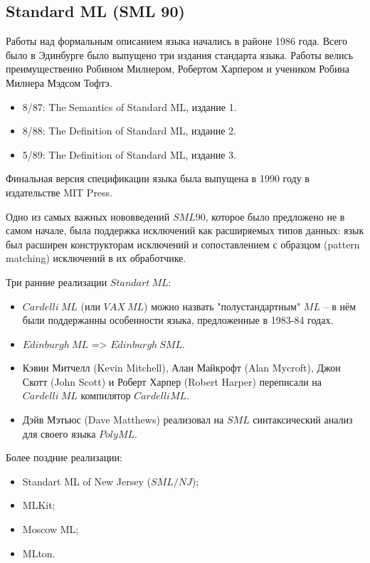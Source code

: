 \documentclass[14pt]{matmex-diploma-custom}
\begin{document}
\subsection{Standard ML (SML 90)}
Работы над формальным описанием языка начались в районе 1986 года. Всего было в Эдинбурге было выпущено три издания стандарта языка. Работы велись преимущественно Робином  Милнером, Робертом Харпером и учеником Робина Милнера Мэдсом Тофтэ.
\begin{itemize}
\item 8/87: The Semantics of Standard ML, издание 1.
\item 8/88: The Definition of Standard ML, издание 2.
\item 5/89: The Definition of Standard ML, издание 3.
\end{itemize}
Финальная версия спецификации языка была выпущена в 1990 году в издательстве MIT Press.

Одно из самых важных нововведений $SML 90$, которое было предложено не в самом начале, была поддержка исключений как расширяемых типов данных: язык был расширен конструкторам исключений и сопоставлением с образцом (pattern matching) исключений в их обработчике. 

Три ранние реализации $Standart\ M\!L$:
\begin{itemize}
\item $Cardelli\ M\!L$ (или $V\!AX\ M\!L$) можно назвать "полустандартным" $M\!L$ -- в нём были поддержанны особенности языка, предложенные в 1983-84 годах.
\item $Edinburgh\ ML$ => $Edinburgh\ SM\!L$.
\item Кэвин Митчелл (Kevin Mitchell), Алан Майкрофт (Alan Mycroft), Джон Скотт (John Scott) и Роберт Харпер (Robert Harper) переписали на $Cardelli\ ML$ компилятор $Cardelli ML$.
\item Дэйв Мэтьюс (Dave Matthews) реализовал на $SML$ синтаксический анализ для своего языка $PolyML$.
\end{itemize}

Более поздние реализации:
\begin{itemize}
 \item Standart ML of New Jersey ($SML/N\!J$);
 \item MLKit;
 \item Moscow ML;
 \item MLton.
\end{itemize}
\end{document}
